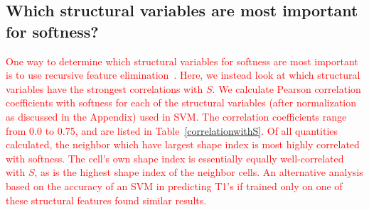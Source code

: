 \documentclass[twoside,twocolumn,9pt]{article}
\begin{document}

\subsection{Which structural variables are most important for softness?}
\textcolor{red}{
One way to determine which structural variables for softness are most important is to use recursive feature elimination~\cite{rfe}. Here, we instead look at which structural variables have the strongest correlations with $S$. We calculate Pearson correlation coefficients with softness for each of the structural variables (after normalization as discussed in the Appendix) used in SVM. The correlation coefficients range from 0.0 to 0.75, and are listed in Table~\ref{correlationwithS}.  Of all quantities calculated, the neighbor which have largest shape index is most highly correlated with softness. The cell's own shape index is essentially equally well-correlated with $S$, as is the highest shape index of the neighbor cells. 
An alternative analysis based on the accuracy of an SVM in predicting T1's if trained only on one of these structural features found similar results.}
\end{document}

